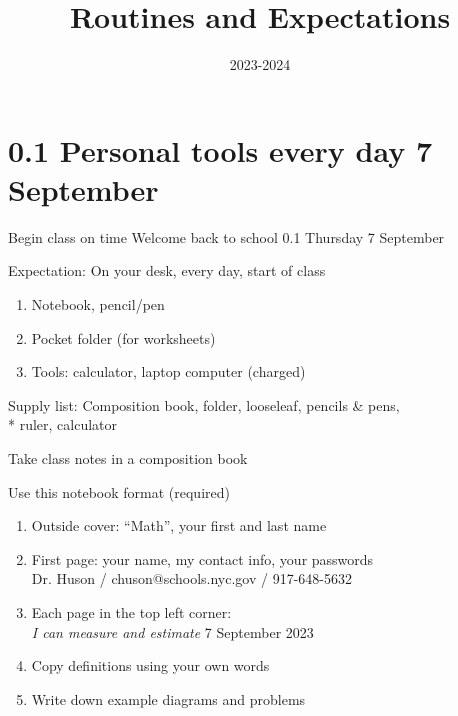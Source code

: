 \documentclass[onlytextwidth]{beamer}
\title{Routines and Expectations}
\date{2023-2024}
\begin{document}
\frame{\titlepage}


\section{0.1 Personal tools every day \hfill 7 September}
\begin{frame}{Begin class on time}
  {Welcome back to school \hfill \alert{0.1 Thursday 7 September}}
  \begin{block}{Expectation: On your desk, every day, start of class}
  \begin{enumerate}
      \item Notebook, pencil/pen
      \item Pocket folder (for worksheets)
      \item Tools: calculator, laptop computer (charged)
  \end{enumerate}
  \end{block}
  Supply list: Composition book, folder, looseleaf, pencils \& pens, \\*
  ruler, calculator
  \end{frame}

\begin{frame}{Take class notes in a composition book}
  \begin{block}{Use this notebook format (required)}
    \begin{enumerate}
      \item Outside cover: ``Math'', your first and last name
      \item First page: your name, my contact info, your passwords \\
      \qquad Dr. Huson / chuson@schools.nyc.gov / 917-648-5632 \vspace{0.25cm}
      \item Each page in the top left corner: \\
      \emph{I can measure and estimate} \hfill 7 September 2023 \vspace{0.25cm}
      \item Copy definitions using your own words
      \item Write down example diagrams and problems
    \end{enumerate}
    \end{block}
  \end{frame}
\end{document}
